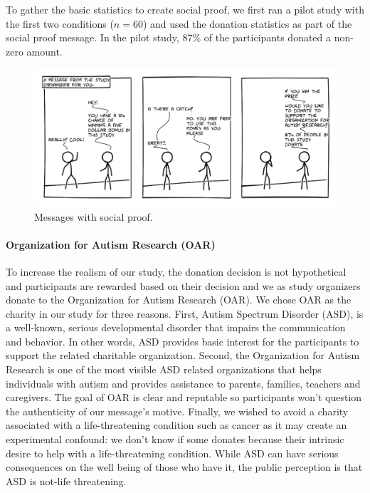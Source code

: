 To gather the basic statistics to create social proof, we first ran a pilot study with the first two conditions ($n=60$) and used the donation statistics as part of the social proof message. In the pilot study, 87\% of the participants donated a non-zero amount. 



\begin{figure}[bt]
	\centering
	\includegraphics[width=\columnwidth]{./figures/social_proof.png}
	\caption{Messages with social proof.}
	\label{fig:basic three comic social proof}
\end{figure}

\paragraph{Organization for Autism Research (OAR)}
To increase the realism of our study, the donation decision is not hypothetical and participants are rewarded based on their decision and we as study organizers donate to the Organization for Autism Research (OAR). We chose OAR as the charity in our study for three reasons. First, Autism Spectrum Disorder (ASD), is a well-known, serious developmental disorder that impairs the communication and behavior. In other words, ASD provides basic interest for the participants to support the related charitable organization. Second, the Organization for Autism Research is one of the most visible ASD related organizations that helps individuals with autism and provides assistance to parents, families, teachers and caregivers. The goal of OAR is clear and reputable so participants won't question the authenticity of our message's motive. Finally, we wished to avoid a charity associated with a life-threatening condition such as cancer as it may create an experimental confound: we don't know if some donates because their intrinsic desire to help with a life-threatening condition. While ASD can have serious consequences on the well being of those who have it, the public perception is that ASD is not-life threatening. 

